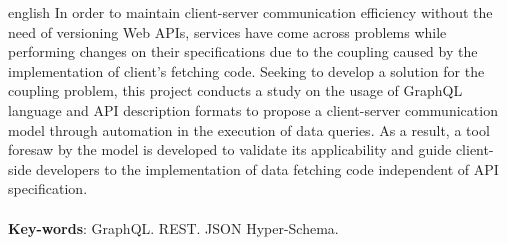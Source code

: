 \begin{resumo}[Abstract]
  \begin{otherlanguage*}{english}
    In order to maintain client-server communication efficiency without the need of versioning Web APIs, services have come across problems while performing changes on their specifications due to the coupling caused by the implementation of client's fetching code. Seeking to develop a solution for the coupling problem, this project conducts a study on the usage of GraphQL language and API description formats to propose a client-server communication model through automation in the execution of data queries. As a result, a tool foresaw by the model is developed to validate its applicability and guide client-side developers to the implementation of data fetching code independent of API specification. \\ \\
    \textbf{Key-words}: GraphQL. REST. JSON Hyper-Schema.
  \end{otherlanguage*}
\end{resumo}